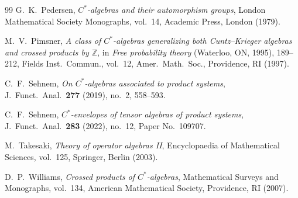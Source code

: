 \documentclass[11pt,final]{amsart}
\numberwithin{equation}{section}
\theoremstyle{plain}
\theoremstyle{definition}
\theoremstyle{remark}
\begin{document}
\begin{thebibliography}{99}
G.\ K.\ Pedersen,
\textit{$C^*$-algebras and their automorphism groups},
London Mathematical Society Monographs, vol.\ 14,
Academic Press, London (1979).

M.\ V.\ Pimsner,
\textit{A class of $C^*$-algebras generalizing both Cuntz--Krieger algebras and
crossed products by $\mathbb{Z}$},
in \textit{Free probability theory} (Waterloo, ON, 1995), 189--212,
Fields Inst.\ Commun., vol.\ 12,
Amer.\ Math.\ Soc., Providence, RI (1997).

C.\ F.\ Sehnem,
\textit{On $C^*$-algebras associated to product systems},
J.\ Funct.\ Anal.\ \textbf{277} (2019), no.\ 2, 558--593.

C.\ F.\ Sehnem,
\textit{$C^*$-envelopes of tensor algebras of product systems},
J.\ Funct.\ Anal.\ \textbf{283} (2022), no.\ 12, Paper No.\ 109707.

M.\ Takesaki,
\textit{Theory of operator algebras II},
Encyclopaedia of Mathematical Sciences, vol.\ 125,
Springer, Berlin (2003).

D.\ P.\ Williams,
\textit{Crossed products of $C^*$-algebras},
Mathematical Surveys and Monographs, vol.\ 134,
American Mathematical Society, Providence, RI (2007).

\end{thebibliography}
\end{document}
